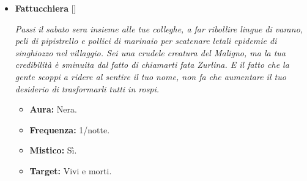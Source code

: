 \documentclass[a4paper,10pt]{article}
\begin{document}
\begin{itemize}
            \emph{Anche se cammini ancora in questa valle di lacrime, ti senti molto portato per l'aldilà. Ti piace passeggiare tra cimiteri abbandonati, chiese sconsacrate e antiche rovine, ululando lugubremente nel vento. Se trovi delle catene, non puoi fare a meno di scuoterle. Non vedi l'ora di tirare le cuoia per far vedere a contadini e lupi mannari di cosa sei capace.}

            \begin{multicols}{2}
                  \begin{itemize}
                        \item \textbf{Aura:} bianca.
                        \item \textbf{Frequenza:} n/a
                        \item \textbf{Mistico:} Sì.
                        \item \textbf{Target:} Nessuno.
                  \end{itemize}
            \end{multicols}

            Il Fantasma non ha alcuna abilità. All'inizio della partita, il Fantasma ottiene un elenco di poteri (eventualmente ripetuti).

            Ogni notte, se il Fantasma è morto, può selezionare un potere dal proprio elenco ed utilizzarlo, specificando il personaggio sul quale lo utilizza ed eventuali ulteriori informazioni. Se tale potere viene utilizzato con successo, viene rimosso dall'elenco.

      \item \textbf{Fattucchiera} []

            \emph{Passi il sabato sera insieme alle tue colleghe, a far ribollire lingue di varano, peli di pipistrello e pollici di marinaio per scatenare letali epidemie di singhiozzo nel villaggio. Sei una crudele creatura del Maligno, ma la tua credibilità è sminuita dal fatto di chiamarti fata Zurlina. E il fatto che la gente scoppi a ridere al sentire il tuo nome, non fa che aumentare il tuo desiderio di trasformarli tutti in rospi.}

            \begin{multicols}{2}
                  \begin{itemize}
                        \item \textbf{Aura:} Nera.
                        \item \textbf{Frequenza:} 1/notte.
                        \item \textbf{Mistico:} Sì.
                        \item \textbf{Target:} Vivi e morti.
                  \end{itemize}
            \end{multicols}


\end{itemize}
\end{document}
